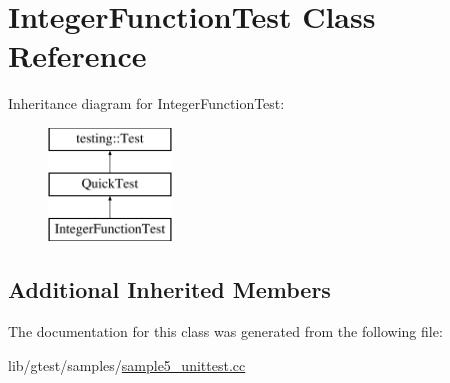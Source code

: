\hypertarget{class_integer_function_test}{\section{Integer\-Function\-Test Class Reference}
\label{class_integer_function_test}
}
Inheritance diagram for Integer\-Function\-Test\-:\begin{figure}[H]
\begin{center}
\leavevmode
\includegraphics[height=3.000000cm]{class_integer_function_test}
\end{center}
\end{figure}
\subsection*{Additional Inherited Members}


The documentation for this class was generated from the following file\-:\begin{DoxyCompactItemize}
\item 
lib/gtest/samples/\hyperlink{sample5__unittest_8cc}{sample5\-\_\-unittest.\-cc}\end{DoxyCompactItemize}
